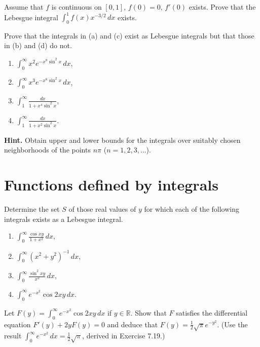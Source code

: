 \begin{problembox}
Assume that $f$ is continuous on $[0, 1]$, $f(0) = 0$, $f'(0)$ exists. Prove that the Lebesgue integral $\int_{0}^{1} f(x)x^{-3/2} \, dx$ exists.
\end{problembox}

\begin{problembox}
Prove that the integrals in (a) and (c) exist as Lebesgue integrals but that those in (b) and (d) do not.
\begin{enumerate}[label=(\alph*)]
    \item $\int_{0}^{\infty} x^2 e^{-x^8 \sin^2 x} \, dx$,
    \item $\int_{0}^{\infty} x^3 e^{-x^8 \sin^2 x} \, dx$,
    \item $\int_{1}^{\infty} \frac{dx}{1 + x^4 \sin^2 x}$,
    \item $\int_{1}^{\infty} \frac{dx}{1 + x^2 \sin^2 x}.$
\end{enumerate}
\textbf{Hint.} Obtain upper and lower bounds for the integrals over suitably chosen neighborhoods of the points $n\pi$ ($n = 1, 2, 3, \ldots$).
\end{problembox}

\section{Functions defined by integrals}

\begin{problembox}
Determine the set $S$ of those real values of $y$ for which each of the following integrals exists as a Lebesgue integral.
\begin{enumerate}[label=(\alph*)]
    \item $\int_{0}^{\infty} \frac{\cos xy}{1 + x^2} \, dx$,
    \item $\int_{0}^{\infty} (x^2 + y^2)^{-1} \, dx$,
    \item $\int_{0}^{\infty} \frac{\sin^2 xy}{x^2} \, dx$,
    \item $\int_{0}^{\infty} e^{-x^2} \cos 2xy \, dx.$
\end{enumerate}
\end{problembox}

\begin{problembox}
Let $F(y) = \int_{0}^{\infty} e^{-x^2} \cos 2xy \, dx$ if $y \in \mathbb{R}$. Show that $F$ satisfies the differential equation $F'(y) + 2y F(y) = 0$ and deduce that $F(y) = \frac{1}{2} \sqrt{\pi} e^{-y^2}$. (Use the result $\int_{0}^{\infty} e^{-x^2} \, dx = \frac{1}{2} \sqrt{\pi}$, derived in Exercise 7.19.)
\end{problembox}

